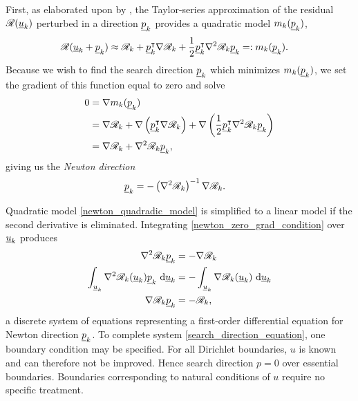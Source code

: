 First, as elaborated upon by \citet{nocedal_2000}, the Taylor-series approximation of the residual $\mathscr{R}(\underline{u}_k)$ perturbed in a direction $\underline{p}_k$ provides a quadratic model $m_k(\underline{p}_k)$,
\begin{align}
  \label{newton_quadradic_model}
  \mathscr{R}(\underline{u}_k + \underline{p}_k) &\approx \mathscr{R}_k + \underline{p}_k^\intercal \nabla \mathscr{R}_k + \frac{1}{2} \underline{p}_k^\intercal \nabla^2 \mathscr{R}_k \underline{p}_k =: m_k(\underline{p}_k).
\end{align}
Because we wish to find the search direction $\underline{p}_k$ which minimizes $m_k(\underline{p}_k)$, we set the gradient of this function equal to zero and solve
\begin{align}
  0 &= \nabla m_k(\underline{p}_k) \notag \\
    &= \nabla \mathscr{R}_k + \nabla \left( \underline{p}_k^\intercal \nabla \mathscr{R}_k \right) + \nabla \left( \frac{1}{2} \underline{p}_k^\intercal \nabla^2 \mathscr{R}_k \underline{p}_k \right) \notag \\
    \label{newton_zero_grad_condition}
    &= \nabla \mathscr{R}_k + \nabla^2 \mathscr{R}_k \underline{p}_k,
\end{align}
giving us the \emph{Newton direction}
\begin{align}
  \label{newton_direction}
  \underline{p}_k &= -\left( \nabla^2 \mathscr{R}_k \right)^{-1} \nabla \mathscr{R}_k.
\end{align}

Quadratic model \cref{newton_quadradic_model} is simplified to a linear model if the second derivative is eliminated.  Integrating \cref{newton_zero_grad_condition} over $\underline{u}_k$ produces
\begin{align}
  \label{search_direction_equation}
  \nabla^2 \mathscr{R}_k \underline{p}_k &= - \nabla \mathscr{R}_k \notag \\
  \int_{\underline{u}_k} \nabla^2 \mathscr{R}_k(\underline{u}_k) \underline{p}_k \ \mathrm{d}\underline{u}_k &= - \int_{\underline{u}_k} \nabla \mathscr{R}_k(\underline{u}_k) \ \mathrm{d}\underline{u}_k \notag \\
  \nabla \mathscr{R}_k \underline{p}_k &= - \mathscr{R}_k,
\end{align}
a discrete system of equations representing a first-order differential equation for Newton direction $\underline{p}_k$.  To complete system \cref{search_direction_equation}, one boundary condition may be specified.  For all Dirichlet boundaries, $u$ is known and can therefore not be improved.  Hence search direction $p = 0$ over essential boundaries.  Boundaries corresponding to natural conditions of $u$ require no specific treatment.

